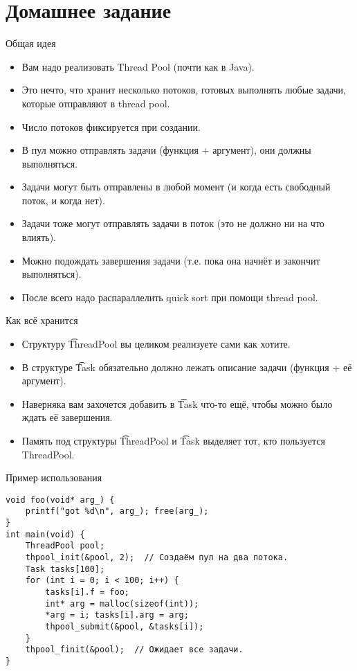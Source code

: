 \section{Домашнее задание}

\begin{frame}
\end{frame}

\begin{frame}{Общая идея}
	\begin{itemize}
		\item Вам надо реализовать Thread Pool (почти как в Java).
		\item Это нечто, что хранит несколько потоков, готовых выполнять любые задачи, которые отправляют в thread pool.
		\item Число потоков фиксируется при создании.
		\item В пул можно отправлять задачи (функция + аргумент), они должны выполняться.
		\item Задачи могут быть отправлены в любой момент (и когда есть свободный поток, и когда нет).
		\item Задачи тоже могут отправлять задачи в поток (это не должно ни на что влиять).
		\item Можно подождать завершения задачи (т.е. пока она начнёт и закончит выполняться).
		\item После всего надо распараллелить quick sort при помощи thread pool.
	\end{itemize}
\end{frame}

\begin{frame}{Как всё хранится}
	\begin{itemize}
		\item Структуру \t{ThreadPool} вы целиком реализуете сами как хотите.
		\item В структуре \t{Task} обязательно должно лежать описание задачи (функция + её аргумент).
		\item Наверняка вам захочется добавить в \t{Task} что-то ещё, чтобы можно было ждать её завершения.
		\item Память под структуры \t{ThreadPool} и \t{Task} выделяет тот, кто пользуется ThreadPool.
	\end{itemize}
\end{frame}

\begin{frame}[fragile]{Пример использования}
\begin{verbatim}
void foo(void* arg_) {
    printf("got %d\n", arg_); free(arg_);
}
int main(void) {
    ThreadPool pool;
    thpool_init(&pool, 2);  // Создаём пул на два потока.
    Task tasks[100];
    for (int i = 0; i < 100; i++) {
        tasks[i].f = foo;
        int* arg = malloc(sizeof(int));
        *arg = i; tasks[i].arg = arg;
        thpool_submit(&pool, &tasks[i]);
    }
    thpool_finit(&pool);  // Ожидает все задачи.
}
\end{verbatim}
\end{frame}

